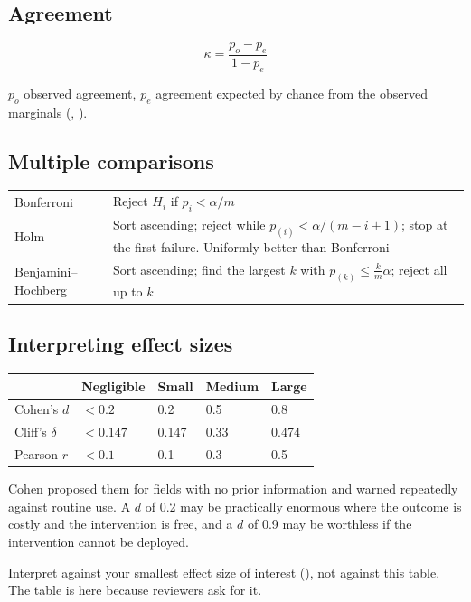 \subsection*{Agreement}

\[
\kappa = \frac{p_o - p_e}{1 - p_e}
\]

\noindent $p_o$ observed agreement, $p_e$ agreement expected by chance from the
observed marginals (, ).

\subsection*{Multiple comparisons}

\begin{center}
\small
\begin{tabular}{@{}L{3.6cm}L{10.7cm}@{}}
\toprule
Bonferroni  & Reject $H_i$ if $p_i < \alpha/m$ \\
Holm        & Sort ascending; reject while $p_{(i)} < \alpha/(m-i+1)$; stop at
              the first failure. Uniformly better than Bonferroni \\
Benjamini--Hochberg & Sort ascending; find the largest $k$ with
              $p_{(k)} \le \frac{k}{m}\alpha$; reject all up to $k$ \\
\bottomrule
\end{tabular}
\end{center}

\subsection*{Interpreting effect sizes}

\begin{center}
\small
\begin{tabular}{@{}L{3.0cm}L{2.6cm}L{2.6cm}L{2.6cm}L{2.4cm}@{}}
\toprule
 & \textbf{Negligible} & \textbf{Small} & \textbf{Medium} & \textbf{Large} \\
\midrule
Cohen's $d$      & $<0.2$ & 0.2 & 0.5 & 0.8 \\
Cliff's $\delta$ & $<0.147$ & 0.147 & 0.33 & 0.474 \\
Pearson $r$      & $<0.1$ & 0.1 & 0.3 & 0.5 \\
\bottomrule
\end{tabular}
\end{center}

\begin{alertbox}
Cohen proposed them for fields with no prior information and warned repeatedly
against routine use. A $d$ of 0.2 may be practically enormous where the outcome
is costly and the intervention is free, and a $d$ of 0.9 may be worthless if
the intervention cannot be deployed.

\medskip
Interpret against your smallest effect size of interest (), not
against this table. The table is here because reviewers ask for it.
\end{alertbox}

